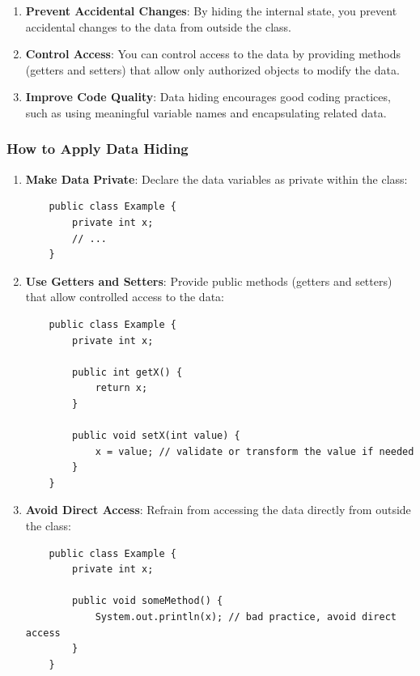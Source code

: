 \documentclass{book}
\begin{document}
\begin{enumerate}
	\item \textbf{Prevent Accidental Changes}: By hiding the internal state, you prevent accidental changes to the data from outside the class.
	\item \textbf{Control Access}: You can control access to the data by providing methods (getters and setters) that allow only authorized objects to modify the data.
	\item \textbf{Improve Code Quality}: Data hiding encourages good coding practices, such as using meaningful variable names and encapsulating related data.
\end{enumerate}

\subsubsection{How to Apply Data Hiding}

\begin{enumerate}
	\item \textbf{Make Data Private}: Declare the data variables as private within the class:
	      \begin{verbatim}
    public class Example {
        private int x;
        // ...
    }
    \end{verbatim}

	\item \textbf{Use Getters and Setters}: Provide public methods (getters and setters) that allow controlled access to the data:
	      \begin{verbatim}
    public class Example {
        private int x;

        public int getX() {
            return x;
        }

        public void setX(int value) {
            x = value; // validate or transform the value if needed
        }
    }
    \end{verbatim}

	\item \textbf{Avoid Direct Access}: Refrain from accessing the data directly from outside the class:
	      \begin{verbatim}
    public class Example {
        private int x;

        public void someMethod() {
            System.out.println(x); // bad practice, avoid direct access
        }
    }
    \end{verbatim}
\end{enumerate}
\end{document}
